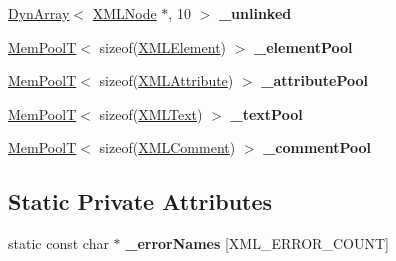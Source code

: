 \begin{DoxyCompactItemize}
\item 
\hyperlink{classtinyxml2_1_1DynArray}{Dyn\+Array}$<$ \hyperlink{classtinyxml2_1_1XMLNode}{X\+M\+L\+Node} $\ast$, 10 $>$ {\bfseries \+\_\+unlinked}\hypertarget{classtinyxml2_1_1XMLDocument_a1d2e0f6b8bf0914058c71f2425edac19}{}\label{classtinyxml2_1_1XMLDocument_a1d2e0f6b8bf0914058c71f2425edac19}

\item 
\hyperlink{classtinyxml2_1_1MemPoolT}{Mem\+PoolT}$<$ sizeof(\hyperlink{classtinyxml2_1_1XMLElement}{X\+M\+L\+Element}) $>$ {\bfseries \+\_\+element\+Pool}\hypertarget{classtinyxml2_1_1XMLDocument_a21574fba363a0d23bfc820d1652ab8bc}{}\label{classtinyxml2_1_1XMLDocument_a21574fba363a0d23bfc820d1652ab8bc}

\item 
\hyperlink{classtinyxml2_1_1MemPoolT}{Mem\+PoolT}$<$ sizeof(\hyperlink{classtinyxml2_1_1XMLAttribute}{X\+M\+L\+Attribute}) $>$ {\bfseries \+\_\+attribute\+Pool}\hypertarget{classtinyxml2_1_1XMLDocument_a0a57ebeba23bc6cfce88f12b4a946aac}{}\label{classtinyxml2_1_1XMLDocument_a0a57ebeba23bc6cfce88f12b4a946aac}

\item 
\hyperlink{classtinyxml2_1_1MemPoolT}{Mem\+PoolT}$<$ sizeof(\hyperlink{classtinyxml2_1_1XMLText}{X\+M\+L\+Text}) $>$ {\bfseries \+\_\+text\+Pool}\hypertarget{classtinyxml2_1_1XMLDocument_afe8ac410aaa53cf1f2142a4c2fd958c7}{}\label{classtinyxml2_1_1XMLDocument_afe8ac410aaa53cf1f2142a4c2fd958c7}

\item 
\hyperlink{classtinyxml2_1_1MemPoolT}{Mem\+PoolT}$<$ sizeof(\hyperlink{classtinyxml2_1_1XMLComment}{X\+M\+L\+Comment}) $>$ {\bfseries \+\_\+comment\+Pool}\hypertarget{classtinyxml2_1_1XMLDocument_ac2e73ccbc037dee917c3163158180398}{}\label{classtinyxml2_1_1XMLDocument_ac2e73ccbc037dee917c3163158180398}

\end{DoxyCompactItemize}
\subsection*{Static Private Attributes}
\begin{DoxyCompactItemize}
\item 
static const char $\ast$ {\bfseries \+\_\+error\+Names} \mbox{[}X\+M\+L\+\_\+\+E\+R\+R\+O\+R\+\_\+\+C\+O\+U\+NT\mbox{]}
\end{DoxyCompactItemize}
